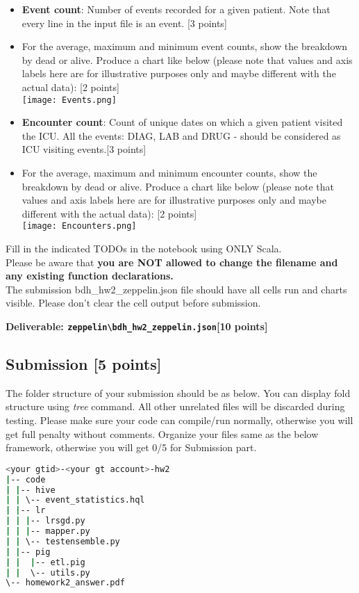 \documentclass[12pt]{article}
\begin{document}
\begin{itemize}
\item \textbf{Event count}: Number of events recorded for a given patient. Note that every line in the input file is an event. [3 points]
\item For the average, maximum and minimum event counts, show the breakdown by dead or alive. Produce a chart like below (please note that values and axis labels here are for illustrative purposes only and maybe different with the actual data): [2 points]\\
\texttt{[image: Events.png]}
\item \textbf{Encounter count}: Count of unique dates on which a given patient visited the ICU. All the events: DIAG, LAB and DRUG - should be considered as ICU visiting events.[3 points]
\item For the average, maximum and minimum encounter counts, show the breakdown by dead or alive. Produce a chart like below (please note that values and axis labels here are for illustrative purposes only and maybe different with the actual data): [2 points]\\
\texttt{[image: Encounters.png]}
\end{itemize}
Fill in the indicated TODOs in the notebook using ONLY Scala.\\

Please be aware that \textbf{\color{red} you are NOT allowed to change the filename and any existing function declarations.}\\

The submission bdh\_hw2\_zeppelin.json file should have all cells run and charts visible. Please don't clear the cell output before submission.

\textbf{Deliverable: \texttt{zeppelin\textbackslash bdh\_hw2\_zeppelin.json}[10 points]}
\fi

\subsection{Submission [5 points]}
The folder structure of your submission should be as below. You can display fold structure using \textit{tree} command. All other unrelated files will be discarded during testing.
Please make sure your code can compile/run normally, otherwise you will get full penalty without comments. Organize your files same as the below framework, otherwise you will get 0/5 for Submission part.
\begin{lstlisting}[language=bash,frame=single]
<your gtid>-<your gt account>-hw2
|-- code
| |-- hive
| | \-- event_statistics.hql
| |-- lr
| | |-- lrsgd.py
| | |-- mapper.py
| | \-- testensemble.py
| |-- pig
| |  |-- etl.pig
| |  \-- utils.py
\-- homework2_answer.pdf
\end{lstlisting}
\end{document}
